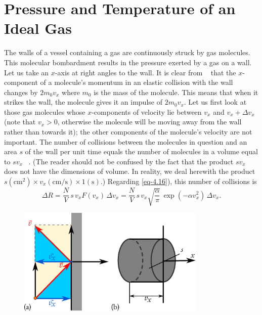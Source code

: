 \section{Pressure and Temperature of an Ideal Gas}

 The walls of a vessel containing a gas are continuously struck by gas molecules. This molecular bombardment results in the pressure exerted by a gas on a wall. Let us take an $x$-axis at right angles to the wall. It is clear from ~ that the $x$-component of a molecule's momentum in an elastic collision with the wall changes by $2m_{0}v_{x}$ where $m_{0}$ is the mass of the molecule. This means that when it strikes the wall, the molecule gives it an impulse of $2m_{0}v_{x}$. Let us first look at those gas molecules whose $x$-components of velocity lie between $v_{x}$ and $v_{x} + \Delta v_{x}$ (note that $v_{x} > 0$, otherwise the molecule will be moving away from the wall rather than towards it); the other components of the molecule's velocity are not important. The number of collisions between the molecules in question and an area $s$ of the wall per unit time equals the number of molecules in a volume equal to $s v_{x}$ ~. (The reader should not be confused by the fact that the product $s v_{x}$ does not have the dimensions of volume. In reality, we deal herewith the product $s(\si{\centi\meter\squared}) \times v_{x} (\si{\centi\meter\per\second}) \times 1 (\si{\second})$.) Regarding \eqref{eq-4.16}), this number of collisions is
\begin{equation*}%
\Delta R = \frac{N}{V} \, s\, v_{x} F(v_{x}) \, \Delta v_{x} =  \frac{N}{V} \, s\, v_{x} \sqrt{\frac{\alpha}{ \pi}} \, \exp (- \alpha v_{x}^{2}) \, \Delta v_{x}.
\end{equation*}

\begin{figure}[!ht]
\centering
\includegraphics[width=0.8\textwidth]{figures/collisions.pdf}
\end{figure}

